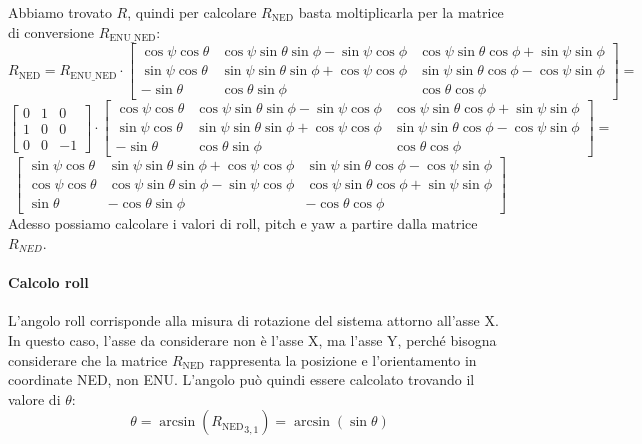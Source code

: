 Abbiamo trovato $R$, quindi per calcolare $R_\mathrm{NED}$ basta moltiplicarla per la matrice di conversione $R_\mathrm{ENU\_NED}$:
\[
	R_\mathrm{NED} =
	R_\mathrm{ENU\_NED}
	\cdot
	\begin{bmatrix}
		\cos\psi\cos\theta &
		\cos\psi\sin\theta\sin\phi-\sin\psi\cos\phi &
		\cos\psi\sin\theta\cos\phi+\sin\psi\sin\phi\\
		\sin\psi\cos\theta &
		\sin\psi\sin\theta\sin\phi+\cos\psi\cos\phi &
		\sin\psi\sin\theta\cos\phi-\cos\psi\sin\phi\\
		-\sin\theta &
		\cos\theta\sin\phi &
		\cos\theta\cos\phi
	\end{bmatrix}
	=
\]
\[
\begin{bmatrix}
	0&1&0\\
	1&0&0\\
	0&0&-1
\end{bmatrix}
\cdot
\begin{bmatrix}
	\cos\psi\cos\theta &
	\cos\psi\sin\theta\sin\phi-\sin\psi\cos\phi &
	\cos\psi\sin\theta\cos\phi+\sin\psi\sin\phi\\
	\sin\psi\cos\theta &
	\sin\psi\sin\theta\sin\phi+\cos\psi\cos\phi &
	\sin\psi\sin\theta\cos\phi-\cos\psi\sin\phi\\
	-\sin\theta &
	\cos\theta\sin\phi &
	\cos\theta\cos\phi
\end{bmatrix}
=
\]
\[
\begin{bmatrix}
	\sin\psi\cos\theta &
	\sin\psi\sin\theta\sin\phi+\cos\psi\cos\phi &
	\sin\psi\sin\theta\cos\phi-\cos\psi\sin\phi\\
	\cos\psi\cos\theta &
	\cos\psi\sin\theta\sin\phi-\sin\psi\cos\phi &
	\cos\psi\sin\theta\cos\phi+\sin\psi\sin\phi\\
	\sin\theta &
	-\cos\theta\sin\phi &
	-\cos\theta\cos\phi
\end{bmatrix}
\]
Adesso possiamo calcolare i valori di roll, pitch e yaw a partire dalla matrice $R_{NED}$.

\paragraph{Calcolo roll} L'angolo roll corrisponde alla misura di rotazione del sistema attorno all'asse X. In questo caso, l'asse da considerare non è l'asse X, ma l'asse Y, perché bisogna considerare che la matrice $R_\mathrm{NED}$ rappresenta la posizione e l'orientamento in coordinate NED, non ENU. L'angolo può quindi essere calcolato trovando il valore di $\theta$:
\[
\boxed{
	\theta = \arcsin({R_\mathrm{NED}}_{3,1}) = \arcsin(\sin\theta)
}
\]

